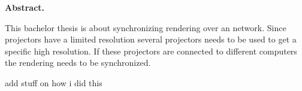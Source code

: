 \mbox{}
\vspace{3cm}
\begin{center}
\begin{minipage}[center]{0.80\textwidth}

\begin{center}
{\normalsize \textbf{Abstract.}}
\end{center}
This bachelor thesis is about synchronizing rendering over an network. Since projectors have a limited resolution several projectors needs to be used to get a specific high resolution. If these projectors are connected to different computers the rendering needs to be synchronized. 

add stuff on how i did this
\end{minipage}
\end{center}
